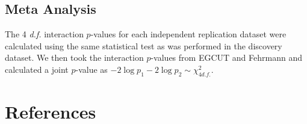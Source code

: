 \documentclass{article}
\begin{document}
\subsection{Meta Analysis}
The 4 \emph{d.f.} interaction $p$-values for each independent replication dataset were calculated using the same statistical test as was performed in the discovery dataset. We then took the interaction $p$-values from EGCUT and Fehrmann and calculated a joint $p$-value as $-2 \log p_{1} - 2 \log p_{2} \sim \chi^{2}_{4 d.f.}$.



\section{References}

\end{document}

